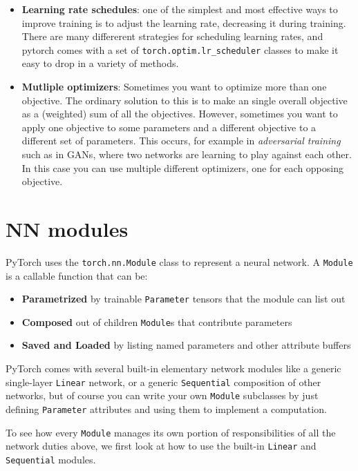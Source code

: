 \begin{itemize}
    \item \textbf{Learning rate schedules}: one of the simplest and most effective ways to improve training is to adjust the learning rate, decreasing it during training.   There are many differerent strategies for scheduling learning rates, and pytorch comes with a set of \texttt{torch.optim.lr\_scheduler} classes to make it easy to drop in a variety of methods.
    \item \textbf{Mutliple optimizers}: Sometimes you want to optimize more than one objective.  The ordinary solution to this is to make an single overall objective as a (weighted) sum of all the objectives.  However, sometimes you want to apply one objective to some parameters and a different objective to a different set of parameters.  This occurs, for example in \textit{adversarial training} such as in GANs, where two networks are learning to play against each other.  In this case you can use multiple different optimizers, one for each opposing objective.
\end{itemize}


\newpage
\section{NN modules}

PyTorch uses the \texttt{torch.nn.Module} class to represent a neural network. A \texttt{Module} is a callable function that can be:
\begin{itemize}
    \item \textbf{Parametrized} by trainable \texttt{Parameter} tensors that the module can list out 
    \item \textbf{Composed} out of children \texttt{Module}s that contribute parameters
    \item \textbf{Saved and Loaded} by listing named parameters and other attribute buffers
\end{itemize}

PyTorch comes with several built-in elementary network modules like a generic single-layer \texttt{Linear} network, or a generic \texttt{Sequential} composition of other networks, but of course you can write your own \texttt{Module} subclasses by just defining \texttt{Parameter} attributes and using them to implement a computation. 

To see how every \texttt{Module} manages its own portion of responsibilities of all the network duties above, we first look at how to use the built-in \texttt{Linear} and \texttt{Sequential} modules. 

